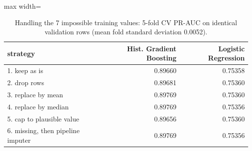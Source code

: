 \begin{table}[H]
\centering
\small
\begin{adjustbox}{max width=\linewidth}
\begin{tabular}{lrr}
\toprule
strategy & Hist. Gradient Boosting & Logistic Regression \\
\midrule
1. keep as is & 0.89660 & 0.75358 \\
2. drop rows & 0.89681 & 0.75360 \\
3. replace by mean & 0.89769 & 0.75360 \\
4. replace by median & 0.89769 & 0.75356 \\
5. cap to plausible value & 0.89656 & 0.75360 \\
6. missing, then pipeline imputer & 0.89769 & 0.75356 \\
\bottomrule
\end{tabular}
\end{adjustbox}
\caption{Handling the 7 impossible training values: 5-fold CV PR-AUC on identical validation rows (mean fold standard deviation 0.0052).}
\label{tab:impossible}
\end{table}
